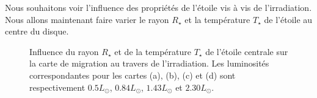 Nous souhaitons voir l'influence des propriétés de l'étoile vis à vis de l'irradiation. Nous allons maintenant faire varier le rayon $R_\star$ et la température $T_\star$ de l'étoile au centre du disque. 

\begin{figure}[htbp]
\centering
{}
\hfill
{}

\hfill
{}
\caption{Influence du rayon $R_\star$ et de la température $T_\star$ de l'étoile centrale sur la carte de migration au travers de l'irradiation. Les luminosités correspondantes pour les cartes (a), (b), (c) et (d) sont respectivement $0.5\unit{L_\odot}$, $0.84\unit{L_\odot}$, $1.43\unit{L_\odot}$ et $2.30\unit{L_\odot}$. }\label{fig:map_TTauri}
\end{figure}

